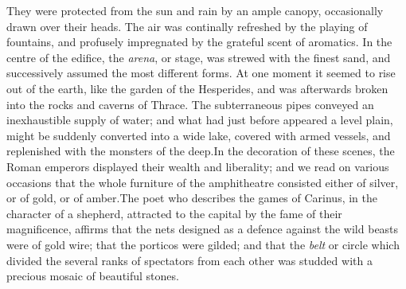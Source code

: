 They were protected from the sun and rain by an ample canopy,
occasionally drawn over their heads. The air was continally
refreshed by the playing of fountains, and profusely impregnated
by the grateful scent of aromatics. In the centre of the edifice,
the \textit{arena}, or stage, was strewed with the finest sand, and
successively assumed the most different forms. At one moment it
seemed to rise out of the earth, like the garden of the
Hesperides, and was afterwards broken into the rocks and caverns
of Thrace. The subterraneous pipes conveyed an inexhaustible
supply of water; and what had just before appeared a level plain,
might be suddenly converted into a wide lake, covered with armed
vessels, and replenished with the monsters of the deep.\footnotemark[95] In the
decoration of these scenes, the Roman emperors displayed their
wealth and liberality; and we read on various occasions that the
whole furniture of the amphitheatre consisted either of silver,
or of gold, or of amber.\footnotemark[96] The poet who describes the games of
Carinus, in the character of a shepherd, attracted to the capital
by the fame of their magnificence, affirms that the nets designed
as a defence against the wild beasts were of gold wire; that the
porticos were gilded; and that the \textit{belt} or circle which divided
the several ranks of spectators from each other was studded with
a precious mosaic of beautiful stones.\footnotemark[97]







